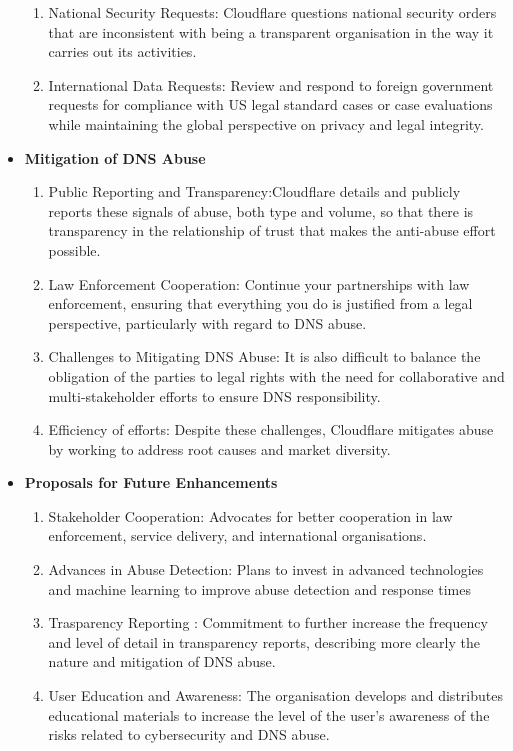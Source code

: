 \begin{itemize}
\begin{enumerate}
        \item National Security Requests: Cloudflare questions national security orders that are inconsistent with being a transparent organisation in the way it carries out its activities.
        \item International Data Requests: Review and respond to foreign government requests for compliance with US legal standard cases or case evaluations while maintaining the global perspective on privacy and legal integrity. 
    \end{enumerate}
    \item \textbf{Mitigation of DNS Abuse}
    \begin{enumerate}
        \item Public Reporting and Transparency:Cloudflare details and publicly reports these signals of abuse, both type and volume, so that there is transparency in the relationship of trust that makes the anti-abuse effort possible.
        \item Law Enforcement Cooperation: Continue your partnerships with law enforcement, ensuring that everything you do is justified from a legal perspective, particularly with regard to DNS abuse.
        \item Challenges to Mitigating DNS Abuse: It is also difficult to balance the obligation of the parties to legal rights with the need for collaborative and multi-stakeholder efforts to ensure DNS responsibility.
        \item Efficiency of efforts: Despite these challenges, Cloudflare mitigates abuse by working to address root causes and market diversity.
    \end{enumerate}
    \item \textbf{Proposals for Future Enhancements}
    \begin{enumerate}
    \item Stakeholder Cooperation: Advocates for better cooperation in law enforcement, service delivery, and international organisations.
    \item Advances in Abuse Detection: Plans to invest in advanced technologies and machine learning to improve abuse detection and response times
    \item Trasparency Reporting : Commitment to further increase the frequency and level of detail in transparency reports, describing more clearly the nature and mitigation of DNS abuse. 
    \item User Education and Awareness: The organisation develops and distributes educational materials to increase the level of the user's awareness of the risks related to cybersecurity and DNS abuse.

\end{enumerate}
\end{itemize}

